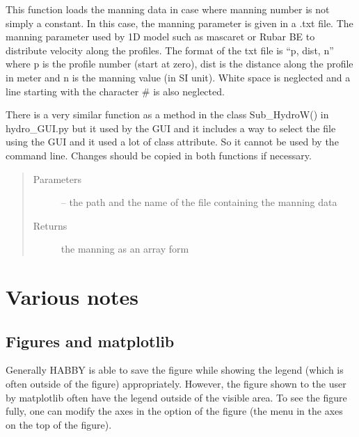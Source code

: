 \documentclass[letterpaper,10pt,english]{sphinxmanual}
\begin{document}
\begin{fulllineitems}
\label{\detokenize{index:src.func_for_cmd.load_manning_txt}}
This function loads the manning data in case where manning number is not simply a constant. In this case, the manning
parameter is given in a .txt file. The manning parameter used by 1D model such as mascaret or Rubar BE to distribute
velocity along the profiles. The format of the txt file is ``p, dist, n'' where  p is the profile number (start at zero),
dist is the distance along the profile in meter and n is the manning value (in SI unit). White space is neglected
and a line starting with the character \# is also neglected.

There is a very similar function as a method in the class Sub\_HydroW() in hydro\_GUI.py but it used by the GUI
and it includes a way to select the file using the GUI and it used a lot of class attribute. So it cannot be used
by the command line. Changes should be copied in both functions if necessary.
\begin{quote}\begin{description}
\item[{Parameters}] \leavevmode
{} -- the path and the name of the file containing the manning data

\item[{Returns}] \leavevmode
the manning as an array form

\end{description}\end{quote}

\end{fulllineitems}



\chapter{Various notes}
\label{\detokenize{index:various-notes}}

\section{Figures and matplotlib}
\label{\detokenize{index:figures-and-matplotlib}}

Generally HABBY is able to save the figure while showing the legend (which is often outside of the figure) appropriately. However,
the figure shown to the user by matplotlib often have the legend outside of the visible area. To see the figure fully, one can modify
the axes in the option of the figure (the menu in the axes on the top of the figure).
\end{document}
